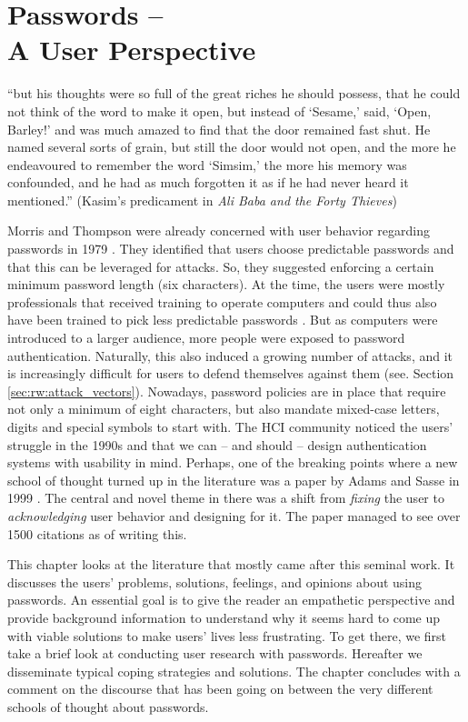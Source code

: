 \chapter[Passwords -- A User Perspective]{Passwords -- \\
	A User Perspective}\label{chap:rw:user_perspective}

``but his thoughts were so full of the great riches he should possess, that he could not think of the word to make it open, but instead of `Sesame,' said, `Open, Barley!' and was much amazed to find that the door remained fast shut. He named several sorts of grain, but still the door would not open, and the more he endeavoured to remember the word `Simsim,' the more his memory was confounded, and he had as much forgotten it as if he had never heard it mentioned.'' (Kasim's predicament in \textit{Ali Baba and the Forty Thieves}) 

Morris and Thompson were already concerned with user behavior regarding passwords in 1979 \cite{Morris1979PasswordSecurity}. They identified that users choose predictable passwords and that this can be leveraged for attacks. So, they suggested enforcing a certain minimum password length (six characters). At the time, the users were mostly professionals that received training to operate computers and could thus also have been trained to pick less predictable passwords \cite{Maguire2012YouOnlyLiveTwice}. But as computers were introduced to a larger audience, more people were exposed to password authentication. Naturally, this also induced a growing number of attacks, and it is increasingly difficult for users to defend themselves against them (see. Section \ref{sec:rw:attack_vectors}). Nowadays, password policies are in place that require not only a minimum of eight characters, but also mandate mixed-case letters, digits and special symbols to start with. The HCI community noticed the users' struggle in the 1990s and that we can -- and should -- design authentication systems with usability in mind. Perhaps, one of the breaking points where a new school of thought turned up in the literature was a paper by Adams and Sasse in 1999 \cite{Adams1999UsersEnemy}. The central and novel theme in there was a shift from \textit{fixing} the user to \textit{acknowledging} user behavior and designing for it. The paper managed to see over 1500 citations as of writing this.

This chapter looks at the literature that mostly came after this seminal work. It discusses the users' problems, solutions, feelings, and opinions about using passwords. An essential goal is to give the reader an empathetic perspective and provide background information to understand why it seems hard to come up with viable solutions to make users' lives less frustrating. To get there, we first take a brief look at conducting user research with passwords. Hereafter we disseminate typical coping strategies and solutions. The chapter concludes with a comment on the discourse that has been going on between the very different schools of thought about passwords. 

